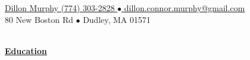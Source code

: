 \documentclass[12pt,notitlepage]{article}
\newenvironment{rhead}
	{\fontfamily{\sfdefault}\selectfont\noindent}
	{\par}
\newenvironment{area}
	{
		\vspace{1em}
		\fontfamily{\sfdefault}\selectfont\begin{singlespace}
	}
	{\\\hrulefill\end{singlespace}\par}
\newcommand{\areaName}[1]{
	\noindent \uline{\hfill\phantom{.}}\\
	\uline{\phantom{.}\hfill{\Large\textbf{#1}}\hfill\phantom{.}}\\
}
\begin{document}
\begin{rhead}
	\uline{
	{\LARGE Dillon Murphy }
	\hfill (774) 303-2828 $\bullet$
	dillon.connor.murphy@gmail.com} \\
	\phantom{}\hfill 80 New Boston Rd $\bullet$
	Dudley, MA 01571 \\
\end{rhead}

\begin{area}
	\areaName{Education}
\end{area}
\end{document}
